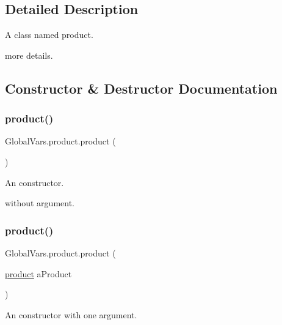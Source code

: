\subsection{Detailed Description}
A class named product. 

more details. 

\subsection{Constructor \& Destructor Documentation}
\mbox{\label{class_global_vars_1_1product_a98e409001908cf1b15212222ce84c22a}} 
\subsubsection{\texorpdfstring{product()}{product()}\hspace{0.1cm}{\footnotesize\ttfamily [1/2]}}
{\footnotesize\ttfamily Global\+Vars.\+product.\+product (\begin{DoxyParamCaption}{ }\end{DoxyParamCaption})\hspace{0.3cm}{\ttfamily [inline]}}



An constructor. 

without argument. \mbox{\label{class_global_vars_1_1product_aea0a467580d4e1dbc977f42140334605}} 
\subsubsection{\texorpdfstring{product()}{product()}\hspace{0.1cm}{\footnotesize\ttfamily [2/2]}}
{\footnotesize\ttfamily Global\+Vars.\+product.\+product (\begin{DoxyParamCaption}\item[{\mbox{\hyperlink{class_global_vars_1_1product}{product}}}]{a\+Product }\end{DoxyParamCaption})\hspace{0.3cm}{\ttfamily [inline]}}



An constructor with one argument. 


